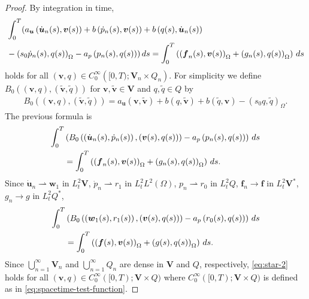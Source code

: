 \documentclass{amsart}
\newcommand{\algn}[1]{\begin{align} #1 \end{align}}
\newcommand{\LRp}[1]{\left( #1 \right)}
\begin{document}
\begin{proof}
By integration in time,
%
\begin{align*}
	&\int_0^T ( a_{\boldsymbol{u}} \LRp{\dot{\boldsymbol{u}}_n (s), \boldsymbol{v} (s)} + b \LRp{\dot{p}_n (s), \boldsymbol{v} (s)} + b \LRp{q(s), \dot{\boldsymbol{u}}_n (s)} \\ \notag
	&- \LRp{s_0 \dot{p}_n (s), q (s)}_{\Omega} - a_p\LRp{ p_n (s), q (s)} ) \, ds = \int_0^T \LRp{\LRp{\boldsymbol{f}_n (s), \boldsymbol{v} (s)}_{\Omega} + \LRp{g_n (s), q (s)}_{\Omega}} \, ds
\end{align*}
%
holds for all $\LRp{\boldsymbol{v}, q} \in C_0^{\infty} \LRp{[0, T); \boldsymbol{V}_n \times Q_n}$. 
For simplicity we define $B_0 \LRp{\LRp{\boldsymbol{v}, q}, \LRp{\tilde{\boldsymbol{v}}, \tilde{q}}}$ for $\boldsymbol{v}, \tilde{\boldsymbol{v}} \in \boldsymbol{V}$ and $q, \tilde{q} \in Q$ by
%
\algn{
	\nonumber B_0 \LRp{\LRp{\boldsymbol{v}, q}, (\tilde{\boldsymbol{v}}, \tilde{q}) }
	= a_{\boldsymbol{u}} ({\boldsymbol{v}, \tilde{\boldsymbol{v}}}) + b ({q, \tilde{\boldsymbol{v}}}) + b \LRp{\tilde{q}, \boldsymbol{v}} - \LRp{s_0 q, \tilde{q}}_{\Omega}.
}
%
The previous formula is
%
\algn{
	\label{eq:star-1} \int_0^T &\LRp{B_0 \LRp{\LRp{\dot{\boldsymbol{u}}_n (s), \dot{p}_n (s)}, \LRp{\boldsymbol{v} (s), q (s)}} - a_p\LRp{ p_n (s), q (s)}} \, ds \\ \notag
	&= \int_0^T \LRp{\LRp{\boldsymbol{f}_n (s), \boldsymbol{v} (s)}_{\Omega} + \LRp{g_n (s), q (s)}_{\Omega}} \, ds .
}
%
Since $\dot{\boldsymbol{u}}_n \rightharpoonup \boldsymbol{w}_1$ in $L_t^2 \boldsymbol{V}$, $\dot{p}_n \rightharpoonup r_1$ in $L_t^2 L^2(\Omega)$, $p_n \rightharpoonup r_0$ in $L_t^2 Q$, $\boldsymbol{f}_n \to \boldsymbol{f}$ in $L_t^2 \boldsymbol{V}^*$, $g_n \to g$ in $L_t^2 Q^*$,
%
\algn{
	\label{eq:star-2} \int_0^T &\LRp{B_0 \LRp{\LRp{\boldsymbol{w}_1 (s), r_1 (s)}, \LRp{\boldsymbol{v} (s), q (s)}} - a_p\LRp{ r_0 (s), q (s)}} \, ds \\ \notag 
	&= \int_0^T \LRp{\LRp{\boldsymbol{f} (s), \boldsymbol{v} (s)}_{\Omega} + \LRp{g (s), q (s)}_{\Omega}} \, ds .
}
%
Since $\bigcup_{n=1}^{\infty} \boldsymbol{V}_n$ and $\bigcup_{n=1}^{\infty} Q_n$ are dense in $\boldsymbol{V}$ and $Q$, respectively, \eqref{eq:star-2} holds for all $\LRp{\boldsymbol{v}, q} \in C_0^{\infty}([0,T);\boldsymbol{V} \times Q)$ where $C_0^{\infty}([0,T);\boldsymbol{V} \times Q)$ is defined as in \eqref{eq:spacetime-test-function}.


\end{proof}
\end{document}
